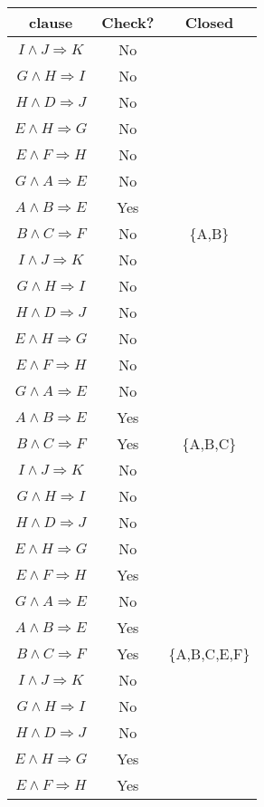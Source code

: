 \documentclass[12pt]{article}
\begin{document}
\begin{table}[H]
\small
\centering
\label{table:example}
\begin{tabular}
{|c|c|c|}	%
\hline 							%
\textbf{clause} & \textbf{Check?} & \textbf{Closed}\\
\hline
$I \wedge J \Rightarrow K$ & No &\\
$G \wedge H \Rightarrow I$ & No &\\
$H \wedge D \Rightarrow J$ & No &\\
$E \wedge H \Rightarrow G$ & No &\\
$E \wedge F \Rightarrow H$ & No &\\
$G \wedge A \Rightarrow E$ & No &\\
$A \wedge B \Rightarrow E$ & Yes &\\
$B \wedge C \Rightarrow F$ & No & \{A,B\}\\
\hline
$I \wedge J \Rightarrow K$ & No &\\
$G \wedge H \Rightarrow I$ & No &\\
$H \wedge D \Rightarrow J$ & No &\\
$E \wedge H \Rightarrow G$ & No &\\
$E \wedge F \Rightarrow H$ & No &\\
$G \wedge A \Rightarrow E$ & No &\\
$A \wedge B \Rightarrow E$ & Yes &\\
$B \wedge C \Rightarrow F$ & Yes & \{A,B,C\}\\
\hline
$I \wedge J \Rightarrow K$ & No &\\
$G \wedge H \Rightarrow I$ & No &\\
$H \wedge D \Rightarrow J$ & No &\\
$E \wedge H \Rightarrow G$ & No &\\
$E \wedge F \Rightarrow H$ & Yes &\\
$G \wedge A \Rightarrow E$ & No &\\
$A \wedge B \Rightarrow E$ & Yes &\\
$B \wedge C \Rightarrow F$ & Yes & \{A,B,C,E,F\}\\
\hline
$I \wedge J \Rightarrow K$ & No &\\
$G \wedge H \Rightarrow I$ & No &\\
$H \wedge D \Rightarrow J$ & No &\\
$E \wedge H \Rightarrow G$ & Yes &\\
$E \wedge F \Rightarrow H$ & Yes &\\

\end{tabular}
\end{table}
\end{document}
